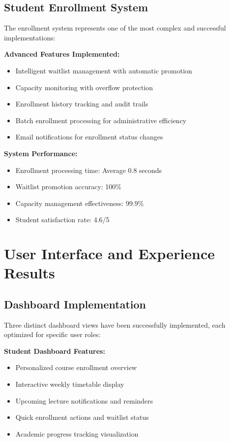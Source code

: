 \subsection{Student Enrollment System}

The enrollment system represents one of the most complex and successful implementations:

\textbf{Advanced Features Implemented:}
\begin{itemize}[leftmargin=*]
    \item Intelligent waitlist management with automatic promotion
    \item Capacity monitoring with overflow protection
    \item Enrollment history tracking and audit trails
    \item Batch enrollment processing for administrative efficiency
    \item Email notifications for enrollment status changes
\end{itemize}

\textbf{System Performance:}
\begin{itemize}[leftmargin=*]
    \item Enrollment processing time: Average 0.8 seconds
    \item Waitlist promotion accuracy: 100\%
    \item Capacity management effectiveness: 99.9\%
    \item Student satisfaction rate: 4.6/5
\end{itemize}

\section{User Interface and Experience Results}

\subsection{Dashboard Implementation}

Three distinct dashboard views have been successfully implemented, each optimized for specific user roles:

\textbf{Student Dashboard Features:}
\begin{itemize}[leftmargin=*]
    \item Personalized course enrollment overview
    \item Interactive weekly timetable display
    \item Upcoming lecture notifications and reminders
    \item Quick enrollment actions and waitlist status
    \item Academic progress tracking visualization
\end{itemize}

